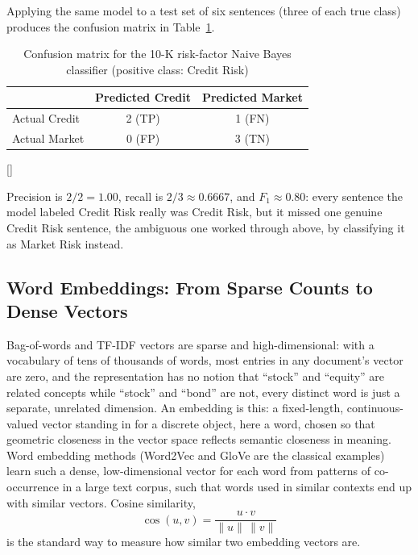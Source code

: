 \documentclass[../ai_in_finance]{subfiles}
\begin{document}
Applying the same model to a test set of six sentences (three of each true class) produces the confusion matrix in Table~\ref{tab:nb_confusion}.

\begin{table}[htbp]
\centering
\begin{lrbox}{\bookmeasuredbox}
\begin{tabular}{lcc}
\toprule
 & Predicted Credit & Predicted Market \\
\midrule
Actual Credit & 2 (TP) & 1 (FN) \\
Actual Market & 0 (FP) & 3 (TN) \\
\bottomrule
\end{tabular}
\end{lrbox}
\ifdim\wd\bookmeasuredbox<0.65\linewidth
\setlength{\bookcapwidth}{0.65\linewidth}
\else
\setlength{\bookcapwidth}{\wd\bookmeasuredbox}
\fi
{}[\bookcapwidth]{
\usebox{\bookmeasuredbox}
}{
\caption{Confusion matrix for the 10-K risk-factor Naive Bayes classifier (positive class: Credit Risk)}
\label{tab:nb_confusion}
}
\end{table}

Precision is $2/2 = 1.00$, recall is $2/3 \approx 0.6667$, and $F_1 \approx 0.80$: every sentence the model labeled Credit Risk really was Credit Risk, but it missed one genuine Credit Risk sentence, the ambiguous one worked through above, by classifying it as Market Risk instead.

\subsection{Word Embeddings: From Sparse Counts to Dense Vectors}
\label{sec:embeddings}

Bag-of-words and TF-IDF vectors are sparse and high-dimensional: with a vocabulary of tens of thousands of words, most entries in any document's
vector are zero, and the representation has no notion that ``stock'' and ``equity'' are related concepts while ``stock'' and ``bond'' are not, every
distinct word is just a separate, unrelated dimension. An embedding is this: a fixed-length, continuous-valued vector standing in for a discrete object, here a word, chosen so that geometric closeness in the vector space reflects semantic closeness in meaning. Word embedding methods (Word2Vec and GloVe are the classical examples) learn such a dense,
low-dimensional vector for each word from patterns of co-occurrence in a large text corpus, such that words used in similar contexts end up with similar
vectors. Cosine similarity,
$$\cos(u,v) = \frac{u \cdot v}{\|u\|\,\|v\|}$$
is the standard way to measure how similar two embedding vectors are.
\end{document}
